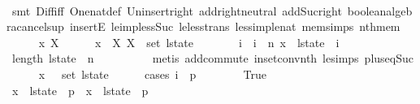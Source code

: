 \begin{isabellebody}
\ \ \ \ \ \ \isamarkupfalse%
\ {\isacharparenleft}smt\ Diff{\isacharunderscore}iff\ One{\isacharunderscore}nat{\isacharunderscore}def\ Un{\isacharunderscore}insert{\isacharunderscore}right\ add{\isachardot}right{\isacharunderscore}neutral\ add{\isacharunderscore}Suc{\isacharunderscore}right\ boolean{\isacharunderscore}algebra{\isacharunderscore}cancel{\isachardot}sup{}\ insertE\ le{\isacharunderscore}imp{\isacharunderscore}less{\isacharunderscore}Suc\ le{\isacharunderscore}less{\isacharunderscore}trans\ less{\isacharunderscore}imp{\isacharunderscore}le{\isacharunderscore}nat\ mem{\isacharunderscore}simps{\isacharparenleft}{}{\isacharparenright}\ nth{\isacharunderscore}mem{\isacharparenright}\isanewline
\ \ \isamarkupfalse%
\isanewline
\ \ \ \ \isamarkupfalse%
\ x\ X\isanewline
\ \ \ \ \isamarkupfalse%
\ {\isachardoublequoteopen}x\ {\isasymin}\ X{\isachardoublequoteclose}\ {\isachardoublequoteopen}X\ {\isasymin}\ set\ l{\isacharunderscore}state{\isachardoublequoteclose}\isanewline
\ \ \ \ \isamarkupfalse%
\ \isamarkupfalse%
\ i\ \ {\isachardoublequoteopen}i\ {\isasymle}\ n{\isachardoublequoteclose}\ {\isachardoublequoteopen}x\ {\isasymin}\ l{\isacharunderscore}state\ {\isacharbang}\ i{\isachardoublequoteclose}\isanewline
\ \ \ \ \ \ \isamarkupfalse%
\ {\isacharbackquoteopen}length\ l{\isacharunderscore}state\ {\isacharequal}\ n\ {\isacharplus}\ {}{\isacharbackquoteclose}\isanewline
\ \ \ \ \ \ \isamarkupfalse%
\ {\isacharparenleft}metis\ add{\isachardot}commute\ in{\isacharunderscore}set{\isacharunderscore}conv{\isacharunderscore}nth\ le{\isacharunderscore}simps{\isacharparenleft}{}{\isacharparenright}\ plus{\isacharunderscore}{}{\isacharunderscore}eq{\isacharunderscore}Suc{\isacharparenright}\isanewline
\ \ \ \ \isamarkupfalse%
\ {\isachardoublequoteopen}x\ {\isasymin}\ {\isasymUnion}\ {\isacharparenleft}set\ l{\isacharunderscore}state{\isacharprime}{\isacharparenright}{\isachardoublequoteclose}\isanewline
\ \ \ \ \isamarkupfalse%
\ {\isacharparenleft}cases\ {\isachardoublequoteopen}i\ {\isacharequal}\ p{}{\isachardoublequoteclose}{\isacharparenright}\isanewline
\ \ \ \ \ \ \isamarkupfalse%
\ True\ \ \ \ \ \ \ \ \ \ \ \ \ \ \isanewline
\ \ \ \ \ \ \isamarkupfalse%
\ {\isachardoublequoteopen}x\ {\isasymin}\ l{\isacharunderscore}state{\isacharprime}\ {\isacharbang}\ p{}\ {\isasymor}\ x\ {\isasymin}\ l{\isacharunderscore}state{\isacharprime}\ {\isacharbang}\ p{}{\isachardoublequoteclose}\isanewline

\end{isabellebody}
